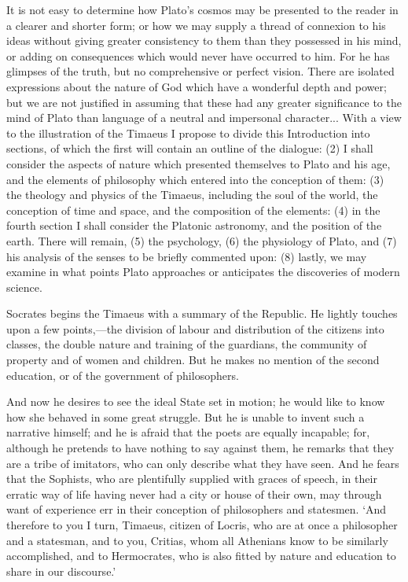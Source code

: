 It is not easy to determine how Plato’s cosmos may be presented to the
reader in a clearer and shorter form; or how we may supply a thread of
connexion to his ideas without giving greater consistency to them than
they possessed in his mind, or adding on consequences which would never
have occurred to him. For he has glimpses of the truth, but no
comprehensive or perfect vision. There are isolated expressions about the
nature of God which have a wonderful depth and power; but we are not
justified in assuming that these had any greater significance to the mind
of Plato than language of a neutral and impersonal character... With a
view to the illustration of the Timaeus I propose to divide this
Introduction into sections, of which the first will contain an outline of
the dialogue: (2) I shall consider the aspects of nature which presented
themselves to Plato and his age, and the elements of philosophy which
entered into the conception of them: (3) the theology and physics of the
Timaeus, including the soul of the world, the conception of time and
space, and the composition of the elements: (4) in the fourth section I
shall consider the Platonic astronomy, and the position of the earth.
There will remain, (5) the psychology, (6) the physiology of Plato, and
(7) his analysis of the senses to be briefly commented upon: (8) lastly,
we may examine in what points Plato approaches or anticipates the
discoveries of modern science.


Socrates begins the Timaeus with a summary of the Republic. He lightly
touches upon a few points,—the division of labour and distribution
of the citizens into classes, the double nature and training of the
guardians, the community of property and of women and children. But he
makes no mention of the second education, or of the government of
philosophers.

And now he desires to see the ideal State set in motion; he would like to
know how she behaved in some great struggle. But he is unable to invent
such a narrative himself; and he is afraid that the poets are equally
incapable; for, although he pretends to have nothing to say against them,
he remarks that they are a tribe of imitators, who can only describe what
they have seen. And he fears that the Sophists, who are plentifully
supplied with graces of speech, in their erratic way of life having never
had a city or house of their own, may through want of experience err in
their conception of philosophers and statesmen. ‘And therefore to you I
turn, Timaeus, citizen of Locris, who are at once a philosopher and a
statesman, and to you, Critias, whom all Athenians know to be similarly
accomplished, and to Hermocrates, who is also fitted by nature and
education to share in our discourse.’

